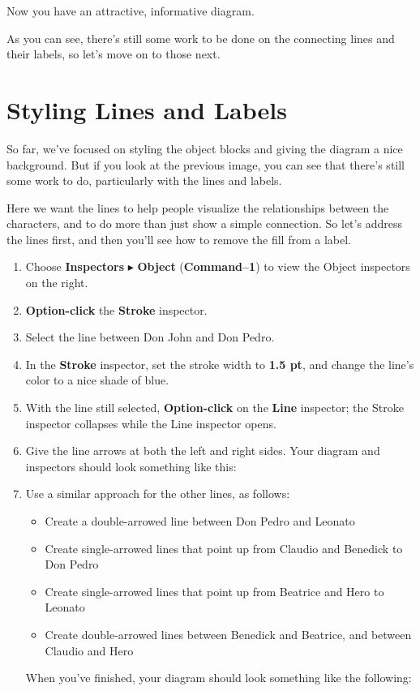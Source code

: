 \documentclass[../main.tex]{subfiles}
\begin{document}
Now you have an attractive, informative diagram.


As you can see, there's still some work to be done on the connecting lines and their labels, so
let's move on to those next.

\section{Styling Lines and Labels}

So far, we've focused on styling the object blocks and giving the diagram a nice background. But
if you look at the previous image, you can see that there's still some work to do,
particularly with the lines and labels.

Here we want the lines to help people visualize the relationships between the characters, and to
do more than just show a simple connection. So let's address the lines first, and then you'll
see how to remove the fill from a label.

\begin{enumerate}
  \item Choose \textbf{Inspectors} $\blacktriangleright$ \textbf{Object} (\textbf{Command--1})
    to view the Object inspectors on the right.
  \item \textbf{Option-click} the \textbf{Stroke} inspector.
  \item Select the line between Don John and Don Pedro.
  \item In the \textbf{Stroke} inspector, set the stroke width to \textbf{1.5 pt}, and change
    the line's color to a nice shade of blue.
  \item With the line still selected, \textbf{Option-click} on the \textbf{Line} inspector; the
    Stroke inspector collapses while the Line inspector opens.
  \item Give the line arrows at both the left and right sides. Your diagram and inspectors
    should look something like this:

  \item Use a similar approach for the other lines, as follows:

    \begin{itemize}
      \item Create a double-arrowed line between Don Pedro and Leonato
      \item Create single-arrowed lines that point up from Claudio and Benedick to Don Pedro
      \item Create single-arrowed lines that point up from Beatrice and Hero to Leonato
      \item Create double-arrowed lines between Benedick and Beatrice, and between Claudio and
        Hero
    \end{itemize}

    When you've finished, your diagram should look something like the following:

\end{enumerate}
\end{document}
